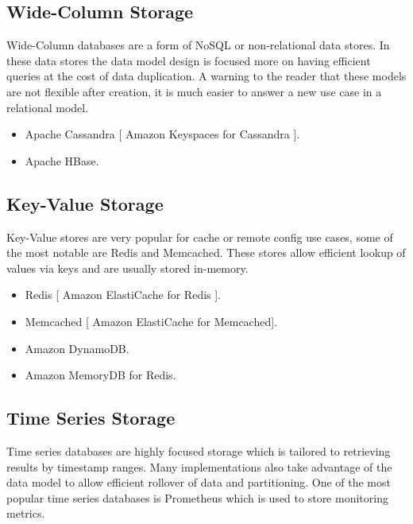\documentclass{csse4400}
\begin{document}
\subsection{Wide-Column Storage}


Wide-Column databases are a form of NoSQL or non-relational data stores.
In these data stores the data model design 
is focused more on having efficient queries at the cost of data duplication.
A warning to the reader that these models
are not flexible after creation, it is much easier to answer a new use case in a relational model.

  \begin{itemize}
    \item Apache Cassandra [ Amazon Keyspaces for Cassandra ].
    \item Apache HBase.
  \end{itemize}

\subsection{Key-Value Storage}

Key-Value stores are very popular for cache or remote config use cases, some of the most notable are Redis and Memcached.
These stores allow efficient lookup of values via keys and are usually stored in-memory.

\begin{itemize}
  \item Redis [ Amazon ElastiCache for Redis ].
  \item Memcached [ Amazon ElastiCache for Memcached].
  \item Amazon DynamoDB.
  \item Amazon MemoryDB for Redis.
\end{itemize}

\subsection{Time Series Storage}


Time series databases are highly focused storage which is tailored to retrieving results by timestamp ranges.
Many implementations also take advantage of the data model to allow efficient rollover of data and partitioning.
One of the most popular time series databases is Prometheus which is used to store monitoring metrics.
\end{document}
